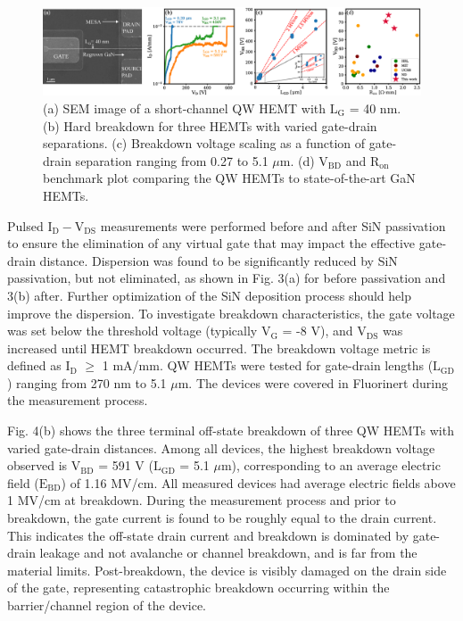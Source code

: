 \documentclass[journal]{IEEEtran}
\begin{document}
\begin{figure}[!t]
\centering
\includegraphics[width=\textwidth]{Figure4_withSEM.eps}
\caption{ (a) SEM image of a short-channel QW HEMT with $\mathrm{L_G}$ = 40 nm. (b) Hard breakdown for three HEMTs with varied gate-drain separations. (c) Breakdown voltage scaling as a function of gate-drain separation ranging from 0.27 to 5.1 $\mu$m. (d) $\mathrm{V_{BD}}$ and $\mathrm{R_{on}}$ benchmark plot comparing the QW HEMTs to state-of-the-art GaN HEMTs. }
\label{fig:benchmark}
\end{figure}


Pulsed $\mathrm{I_D-V_{DS}}$ measurements were performed before and after SiN passivation to ensure the elimination of any virtual gate that may impact the effective gate-drain distance. Dispersion was found to be significantly reduced by SiN passivation, but not eliminated, as shown in Fig. 3(a) for before passivation and 3(b) after. Further optimization of the SiN deposition process should help improve the dispersion. To investigate breakdown characteristics, the gate voltage was set below the threshold voltage (typically $\mathrm{V_G}$ = -8 V), and $\mathrm{V_{DS}}$ was increased until HEMT breakdown occurred. The breakdown voltage metric is defined as $\mathrm{I_D}$ $\geq$ 1 mA/mm. QW HEMTs were tested for gate-drain lengths ($\mathrm{L_{GD}}$) ranging from 270 nm to 5.1 $\mu$m. The devices were covered in Fluorinert during the measurement process.

Fig. 4(b) shows the three terminal off-state breakdown of three QW HEMTs with varied gate-drain distances. Among all devices, the highest breakdown voltage observed is $\mathrm{V_{BD}}$ = 591 V ($\mathrm{L_{GD}}$ = 5.1 $\mu$m), corresponding to an average electric field ($\mathrm{E_{BD}}$) of 1.16 MV/cm. All measured devices had average electric fields above 1 MV/cm at breakdown. During the measurement process and prior to breakdown, the gate current is found to be roughly equal to the drain current. This indicates the off-state drain current and breakdown is dominated by gate-drain leakage and not avalanche or channel breakdown, and is far from the material limits. Post-breakdown, the device is visibly damaged on the drain side of the gate, representing catastrophic breakdown occurring within the barrier/channel region of the device.
\end{document}
